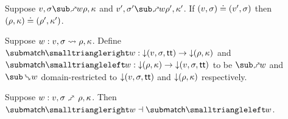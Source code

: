 

\begin{lemma}
   Suppose $v, \sigma \matchFwdR{w} \rho, \kappa$ and $v', \sigma' \matchFwdR{w} \rho', \kappa'$. If $(v, \sigma) \doteq (v', \sigma)$ then $(\rho, \kappa) \doteq (\rho', \kappa')$.
\end{lemma}

\begin{definition}
   Suppose $w: v, \sigma \rightsquigarrow \rho, \kappa$. Define $\matchFwdF{w}: \Below{(v,\sigma,\TT)} \to \Below{(\rho,\kappa)}$ and $\matchBwdF{w}: \Below{(\rho,\kappa)} \to \Below{(v,\sigma,\TT)}$ to be $\matchFwdR{w}$ and $\matchBwdR{w}$ domain-restricted to ${\downarrow}{(v,\sigma,\mathsf{tt})}$ and ${\downarrow}{(\rho,\kappa)}$ respectively.
\end{definition}

\begin{theorem}
\label{thm:core-language:match:gc}
   Suppose $w: v, \sigma \matchFwdS \rho, \kappa$.  Then $\matchFwdF{w} \adjoint \matchBwdF{w}$.
\end{theorem}
